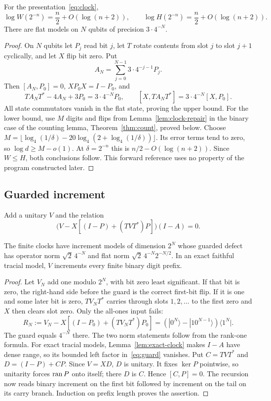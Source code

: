 \begin{theorem}\label{thm:clock-profile}
For the presentation~\eqref{eq:clock},
\[
 \log W(2^{-n})=\frac n2+O(\log(n+2)),\qquad
 \log H(2^{-n})=\frac n2+O(\log(n+2)).
\]
There are flat models on $N$ qubits of precision $3\cdot4^{-N}$.
\end{theorem}
\begin{proof}
On $N$ qubits let $P_j$ read bit $j$, let $T$ rotate contents from slot $j$ to slot $j+1$ cyclically, and let $X$ flip bit zero. Put
\begin{equation}\label{eq:finite-clock}
 A_N=\sum_{j=0}^{N-1}3\cdot4^{-j-1}P_j.
\end{equation}
Then $[A_N,P_0]=0$, $XP_0X=I-P_0$, and
\[
 TA_NT^*-4A_N+3P_0=3\cdot4^{-N}P_0,\qquad
 [X,TA_NT^*]=3\cdot4^{-N}[X,P_0].
\]
All state commutators vanish in the flat state, proving the upper bound. For the lower bound, use $M$ digits and flips from Lemma~\ref{lem:clock-repair} in the binary case of the counting lemma, Theorem~\ref{thm:count}, proved below. Choose $M=\lfloor\log_4(1/\delta)-20\log_4(2+\log_4(1/\delta))\rfloor$. Its error terms tend to zero, so $\log d\ge M-o(1)$. At $\delta=2^{-n}$ this is $n/2-O(\log(n+2))$. Since $W\le H$, both conclusions follow. This forward reference uses no property of the program constructed later.
\end{proof}

\subsection{Guarded increment}
Add a unitary $V$ and the relation
\begin{equation}\label{eq:guard}
 \bigl(V-X[(I-P)+(TVT^*)P]\bigr)(I-A)=0.
\end{equation}
\begin{proposition}\label{prop:increment}
The finite clocks have increment models of dimension $2^N$ whose guarded defect has operator norm $\sqrt2\,4^{-N}$ and flat norm $\sqrt2\,4^{-N}2^{-N/2}$. In an exact faithful tracial model, $V$ increments every finite binary digit prefix.
\end{proposition}
\begin{proof}
Let $V_N$ add one modulo $2^N$, with bit zero least significant. If that bit is zero, the right-hand side before the guard is the correct first-bit flip. If it is one and some later bit is zero, $TV_NT^*$ carries through slots $1,2,\ldots$ to the first zero and $X$ then clears slot zero. Only the all-ones input fails:
\[
 R_N:=V_N-X[(I-P_0)+(TV_NT^*)P_0]
   =(|0^N\rangle-|10^{N-1}\rangle)\langle1^N|.
\]
The guard equals $4^{-N}$ there. The two norm statements follow from the rank-one formula. For exact tracial models, Lemma~\ref{lem:exact-clock} makes $I-A$ have dense range, so its bounded left factor in~\eqref{eq:guard} vanishes. Put $C=TVT^*$ and $D=(I-P)+CP$. Since $V=XD$, $D$ is unitary. It fixes $\ker P$ pointwise, so unitarity forces $\operatorname{ran} P$ onto itself; there $D$ is $C$. Hence $[C,P]=0$. The recursion now reads binary increment on the first bit followed by increment on the tail on its carry branch. Induction on prefix length proves the assertion.
\end{proof}

